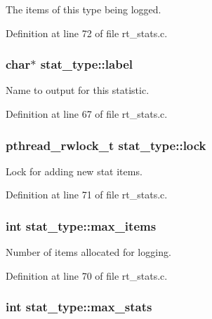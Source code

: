 The items of this type being logged. 



Definition at line 72 of file rt\-\_\-stats.\-c.

\hypertarget{structstat__type_a4859052f95e109f5fef80c48883707c9}{
\subsubsection[{label}]{\setlength{\rightskip}{0pt plus 5cm}char$\ast$ stat\-\_\-type\-::label}}\label{structstat__type_a4859052f95e109f5fef80c48883707c9}


Name to output for this statistic. 



Definition at line 67 of file rt\-\_\-stats.\-c.

\hypertarget{structstat__type_a22f632f9d74f51d3bd8d95a5c8b2536e}{
\subsubsection[{lock}]{\setlength{\rightskip}{0pt plus 5cm}pthread\-\_\-rwlock\-\_\-t stat\-\_\-type\-::lock}}\label{structstat__type_a22f632f9d74f51d3bd8d95a5c8b2536e}


Lock for adding new stat items. 



Definition at line 71 of file rt\-\_\-stats.\-c.

\hypertarget{structstat__type_af697600ffa976b8c4530f7e20e817023}{
\subsubsection[{max\-\_\-items}]{\setlength{\rightskip}{0pt plus 5cm}int stat\-\_\-type\-::max\-\_\-items}}\label{structstat__type_af697600ffa976b8c4530f7e20e817023}


Number of items allocated for logging. 



Definition at line 70 of file rt\-\_\-stats.\-c.

\hypertarget{structstat__type_aa53de19c795fd6100739929a37000248}{
\subsubsection[{max\-\_\-stats}]{\setlength{\rightskip}{0pt plus 5cm}int stat\-\_\-type\-::max\-\_\-stats}}\label{structstat__type_aa53de19c795fd6100739929a37000248}


